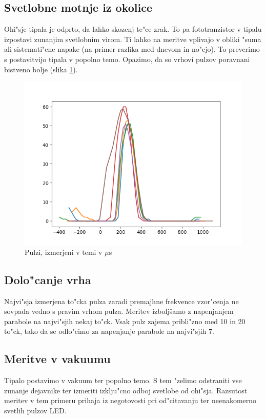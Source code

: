 \documentclass[11pt,a4paper]{article}
\begin{document}
\subsection{Svetlobne motnje iz okolice}
Ohi"sje tipala je odprto, da lahko skozenj te"ce zrak. To pa fototranzistor v tipalu izpostavi zunanjim svetlobnim virom. Ti lahko na meritve vplivajo v obliki "suma ali sistemati"cne napake (na primer razlika med dnevom in no"cjo). To preverimo s postavitvijo tipala v popolno temo. Opazimo, da so vrhovi pulzov poravnani bistveno bolje (slika \ref{dark}). 

\begin{figure}[H]
	\begin{center}
		\includegraphics[width=12cm]{dark.png}
		\caption{Pulzi, izmerjeni v temi v $\mu$s}
		\label{dark}
	\end{center}
\end{figure}

\subsection{Dolo"canje vrha}
Najvi"sja izmerjena to"cka pulza zaradi premajhne frekvence vzor"cenja ne sovpada vedno s pravim vrhom pulza. 
Meritev izboljšamo z napenjanjem parabole na najvi"sjih nekaj to"ck. Vsak pulz zajema pribli"zno med 10 in 20 to"ck, tako da se odlo"cimo za napenjanje parabole na najvi"sjih 7.

\subsection{Meritve v vakuumu}
Tipalo postavimo v vakuum ter popolno temo. S tem "zelimo odstraniti vse zunanje dejavnike ter izmeriti izklju"cno odboj svetlobe od ohi"sja. Razsutost meritev v tem primeru prihaja iz negotovosti pri od"citavanju ter neenakomerno svetlih pulzov LED.
\end{document}
